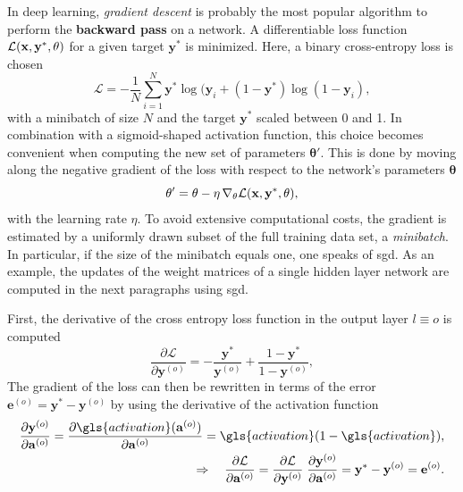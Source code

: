 In deep learning, \emph{gradient descent} is probably the most popular algorithm to perform the \textbf{backward pass} on a network. A differentiable loss function $\mathcal{L}(\mathbf{\mathbf{x}, y^*, \theta})$ for a given target $\textbf{y}^*$ is minimized. Here, a binary cross-entropy loss is chosen
\begin{equation*}
\mathcal{L} = - \frac{1}{N} \sum_{i=1}^N \textbf{y}^* \log(\textbf{y}_i + (1-\textbf{y}^*) \log(1 - \textbf{y}_i), 
\end{equation*}
with a minibatch of size $N$ and the target $\textbf{y}^*$ scaled between 0 and 1. In combination with a sigmoid-shaped activation function, this choice becomes convenient when computing the new set of parameters $\mathbf{\theta}'$. This is done by moving along the negative gradient of the loss with respect to the network's parameters $\mathbf{\theta}$
\begin{equation}
\mathbf{\theta'} = \mathbf{\theta} - \eta \, \nabla_\theta\mathcal{L}(\mathbf{\mathbf{x}, y^*, \mathbf{\theta}}),
\label{stochasticgradientdescent}
\end{equation}
with the learning rate $\eta$. To avoid extensive computational costs, the gradient is estimated by a uniformly drawn subset of the full training data set, a \emph{minibatch}. In particular, if the size of the minibatch equals one, one speaks of \gls{sgd}. As an example, the updates of the weight matrices of a single hidden layer network are computed in the next paragraphs using \gls{sgd}.

First, the derivative of the cross entropy loss function in the output layer $l\equiv o$ is computed
\begin{equation*}
\frac{\partial\mathcal{L}}{\partial \mathbf{y}^{(o)}} = 
- \frac{\mathbf{y}^*}{\mathbf{y}^{(o)}} + 
\frac{1 - \mathbf{y}^*}{1 - \mathbf{y}^{(o)}},
\end{equation*}
The gradient of the loss can then be rewritten in terms of the error $\mathbf{e}^{(o)} = \mathbf{y}^* - \mathbf{y}^{(o)}$ by using the derivative of the activation function
\begin{align*}
\frac{\partial \mathbf{y}^{(o)}}{\partial \mathbf{a}^{(o)}} = \frac{\partial \gls{activation}(\mathbf{a}^{(o)})}{\partial \mathbf{a}^{(o)}} = \gls{activation} (1 - \gls{activation}),\\
\Rightarrow \quad \frac{\partial\mathcal{L}}{\partial \mathbf{a}^{(o)}} =
\frac{\partial\mathcal{L}}{\partial \mathbf{y}^{(o)}} 
\; \frac{\partial \mathbf{y}^{(o)}}{\partial \mathbf{a}^{(o)}} =
\mathbf{y}^* - \mathbf{y}^{(o)} = \mathbf{e}^{(o)}.
\end{align*}

